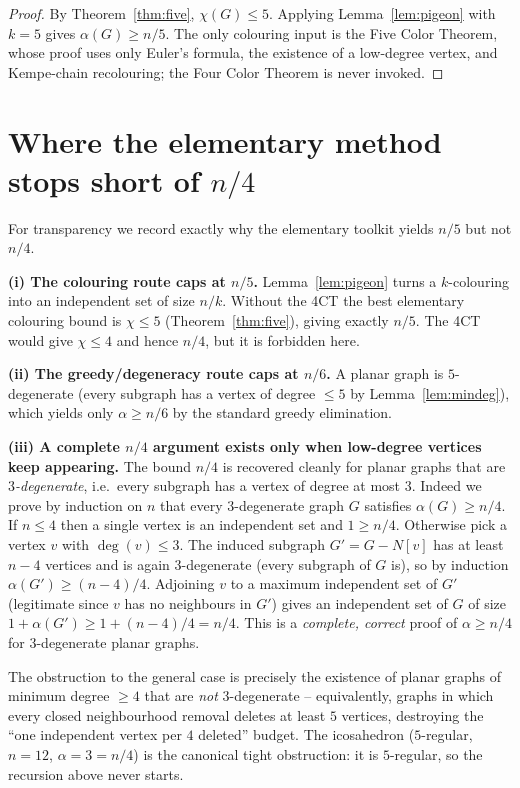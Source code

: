 \documentclass{amsart}
\theoremstyle{remark}
\begin{document}
\begin{proof}
By Theorem~\ref{thm:five}, $\chi(G)\le5$. Applying Lemma~\ref{lem:pigeon} with
$k=5$ gives $\alpha(G)\ge n/5$. The only colouring input is the Five Color
Theorem, whose proof uses only Euler's formula, the existence of a low-degree
vertex, and Kempe-chain recolouring; the Four Color Theorem is never invoked.
\end{proof}

\section{Where the elementary method stops short of \texorpdfstring{$n/4$}{n/4}}
\label{sec:gap}

For transparency we record exactly why the elementary toolkit yields $n/5$ but
not $n/4$.

\medskip
\noindent\textbf{(i) The colouring route caps at $n/5$.}
Lemma~\ref{lem:pigeon} turns a $k$-colouring into an independent set of size
$n/k$. Without the 4CT the best elementary colouring bound is $\chi\le5$
(Theorem~\ref{thm:five}), giving exactly $n/5$. The 4CT would give $\chi\le4$ and
hence $n/4$, but it is forbidden here.

\medskip
\noindent\textbf{(ii) The greedy/degeneracy route caps at $n/6$.}
A planar graph is $5$-degenerate (every subgraph has a vertex of degree $\le5$ by
Lemma~\ref{lem:mindeg}), which yields only $\alpha\ge n/6$ by the standard greedy
elimination.

\medskip
\noindent\textbf{(iii) A complete $n/4$ argument exists only when low-degree
vertices keep appearing.}
The bound $n/4$ is recovered cleanly for planar graphs that are
\emph{$3$-degenerate}, i.e.\ every subgraph has a vertex of degree at most $3$.
Indeed we prove by induction on $n$ that every $3$-degenerate graph $G$ satisfies
$\alpha(G)\ge n/4$. If $n\le4$ then a single vertex is an independent set and
$1\ge n/4$. Otherwise pick a vertex $v$ with $\deg(v)\le3$. The induced subgraph
$G'=G-N[v]$ has at least $n-4$ vertices and is again $3$-degenerate (every
subgraph of $G$ is), so by induction $\alpha(G')\ge (n-4)/4$. Adjoining $v$ to a
maximum independent set of $G'$ (legitimate since $v$ has no neighbours in $G'$)
gives an independent set of $G$ of size $1+\alpha(G')\ge 1+(n-4)/4=n/4$. This is a
\emph{complete, correct} proof of $\alpha\ge n/4$ for $3$-degenerate planar
graphs.

The obstruction to the general case is precisely the existence of planar graphs of
minimum degree $\ge4$ that are \emph{not} $3$-degenerate -- equivalently, graphs
in which every closed neighbourhood removal deletes at least $5$ vertices,
destroying the ``one independent vertex per $4$ deleted'' budget. The icosahedron
($5$-regular, $n=12$, $\alpha=3=n/4$) is the canonical tight obstruction: it is
$5$-regular, so the recursion above never starts.
\end{document}
